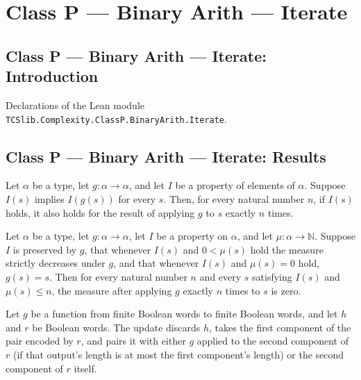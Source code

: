 \section{Class P --- Binary Arith --- Iterate}
\subsection*{Class P --- Binary Arith --- Iterate: Introduction}

Declarations of the Lean module \texttt{TCSlib.Complexity.ClassP.BinaryArith.Iterate}.

\subsection*{Class P --- Binary Arith --- Iterate: Results}

\begin{theorem}
\label{Complexity.BinArith.iterate_invariant}
\leanok
{}
Let $\alpha$ be a type, let $g:\alpha\to\alpha$, and let $I$ be a property of elements
of $\alpha$. Suppose $I(s)$ implies $I(g(s))$ for every $s$. Then, for every natural
number $n$, if $I(s)$ holds, it also holds for the result of applying $g$ to $s$ exactly
$n$ times.
\end{theorem}

\begin{theorem}
\label{Complexity.BinArith.iterate_measure_eq_zero}
\leanok
{}
Let $\alpha$ be a type, let $g:\alpha\to\alpha$, let $I$ be a property on $\alpha$, and
let $\mu:\alpha\to\mathbb{N}$. Suppose $I$ is preserved by $g$, that whenever $I(s)$ and
$0<\mu(s)$ hold the measure strictly decreases under $g$, and that whenever $I(s)$ and
$\mu(s)=0$ hold, $g(s)=s$. Then for every natural number $n$ and every $s$ satisfying
$I(s)$ and $\mu(s)\le n$, the measure after applying $g$ exactly $n$ times to $s$ is
zero.
\end{theorem}

\begin{definition}
\label{Complexity.BinArith.guardNxt}
\leanok
{}
Let $g$ be a function from finite Boolean words to finite Boolean words, and let $h$ and
$r$ be Boolean words. The update discards $h$, takes the first component of the pair
encoded by $r$, and pairs it with either $g$ applied to the second component of $r$ (if
that output's length is at most the first component's length) or the second component of
$r$ itself.
\end{definition}

